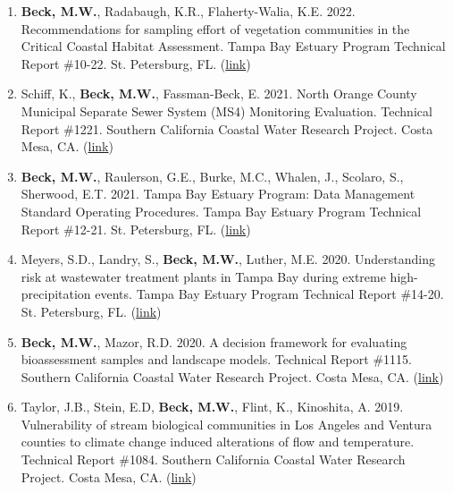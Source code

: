 \documentclass[letterpaper,12pt]{article}
\begin{document}
\begin{enumerate}
\item \textbf{Beck, M.W.}, Radabaugh, K.R., Flaherty-Walia, K.E. 2022. Recommendations for sampling effort of vegetation communities in the Critical Coastal Habitat Assessment. Tampa Bay Estuary Program Technical Report \#10-22. St. Petersburg, FL. ({\footnotesize\href{https://drive.google.com/file/d/1FAQFdw5oXunCQe-wGrwvnnOGTqaIHdFE/view?usp=sharing}{link}})

\item Schiff, K., \textbf{Beck, M.W.}, Fassman-Beck, E. 2021. North Orange County Municipal Separate Sewer System (MS4) Monitoring Evaluation. Technical Report \#1221. Southern California Coastal Water Research Project. Costa Mesa, CA. ({\footnotesize\href{https://ftp.sccwrp.org/pub/download/DOCUMENTS/TechnicalReports/1221_OCMonitoringEvaluation.pdf}{link}})

\item \textbf{Beck, M.W.}, Raulerson, G.E., Burke, M.C., Whalen, J., Scolaro, S., Sherwood, E.T. 2021. Tampa Bay Estuary Program: Data Management Standard Operating Procedures. Tampa Bay Estuary Program Technical Report \#12-21. St. Petersburg, FL. ({\footnotesize\href{https://drive.google.com/file/d/1vO4B8DJATgCSV1qOxZz-kN6Uj1BrgNsg/view?usp=sharing}{link}})

\item Meyers, S.D., Landry, S., \textbf{Beck, M.W.}, Luther, M.E. 2020. Understanding risk at wastewater treatment plants in Tampa Bay during extreme high-precipitation events. Tampa Bay Estuary Program Technical Report \#14-20. St. Petersburg, FL. ({\footnotesize\href{https://drive.google.com/file/d/1JTujiT7f7WUTF5r7__QqHwfq1oGmKj-s/view}{link}})

\item \textbf{Beck, M.W.}, Mazor, R.D. 2020. A decision framework for evaluating bioassessment samples and landscape models. Technical Report \#1115. Southern California Coastal Water Research Project. Costa Mesa, CA. ({\footnotesize\href{http://ftp.sccwrp.org/pub/download/DOCUMENTS/TechnicalReports/1115_CSCIDecisionFramework.pdf}{link}})

\item Taylor, J.B., Stein, E.D, \textbf{Beck, M.W.}, Flint, K., Kinoshita, A. 2019. Vulnerability of stream biological communities in Los Angeles and Ventura counties to climate change induced alterations of flow and temperature. Technical Report \#1084. Southern California Coastal Water Research Project. Costa Mesa, CA. ({\footnotesize\href{http://ftp.sccwrp.org/pub/download/DOCUMENTS/TechnicalReports/1084_ClimateChangeVulnerability.pdf}{link}})


\end{enumerate}
\end{document}
